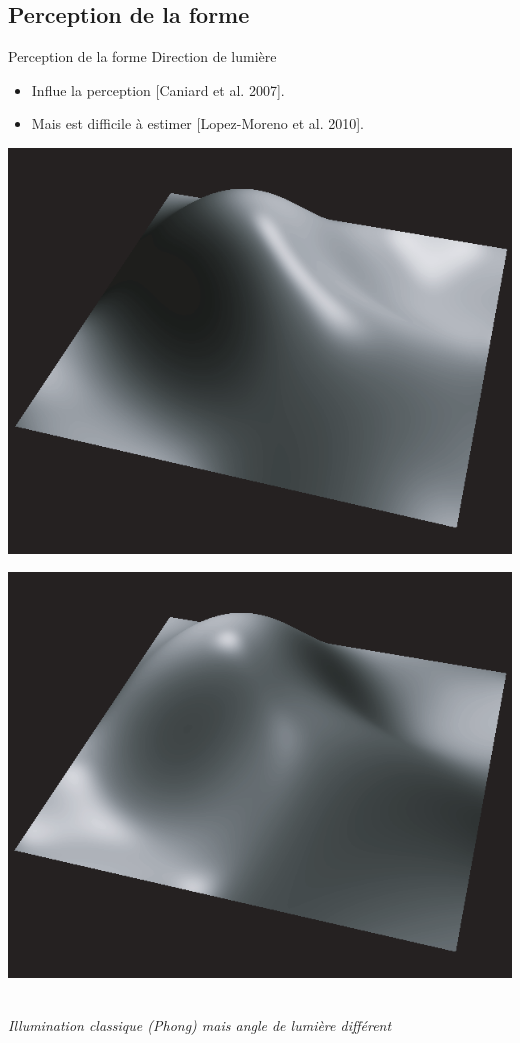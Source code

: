\documentclass{beamer}
\begin{document}
\subsection*{Perception de la forme}
\begin{frame}{Perception de la forme}
Direction de lumière
\begin{itemize}
\item Influe la perception [Caniard et al. 2007].
\item Mais est difficile à estimer [Lopez-Moreno et al. 2010]. 
\end{itemize}
\begin{center}
    \begin{minipage}[c]{0.45\linewidth}
    \begin{center}
    	\includegraphics[width=0.8\linewidth]{Etat_de_lart/perception_1.png}
    \end{center}
    \end{minipage}
    \begin{minipage}[c]{0.45\linewidth}
    \begin{center}
    	\includegraphics[width=0.8\linewidth]{Etat_de_lart/perception_2.png}
    \end{center}
    \end{minipage}
    ~\\
    \textit{Illumination classique (Phong) mais angle de lumière différent}
	

\end{center}
\end{frame}
\end{document}
